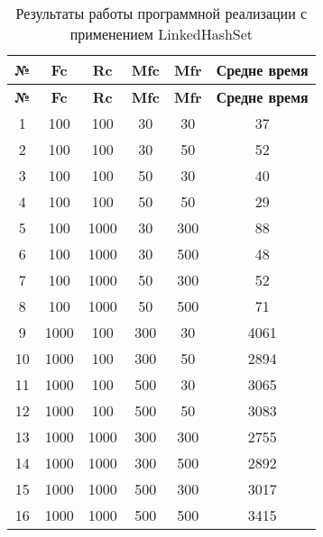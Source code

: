 \begin{longtable}{|c|c|c|c|c|c|}
    \caption{Результаты работы программной реализации с применением LinkedHashSet}
    \label{tab:linkedhashset}\\
    \hline
    \bfseries{№} & \bfseries{Fc} & \bfseries{Rc} & \bfseries{Mfc} & \bfseries{Mfr} & \bfseries{Средне время} \\
    \hline
    \endfirsthead
    \hline
    \bfseries{№} & \bfseries{Fc} & \bfseries{Rc} & \bfseries{Mfc} & \bfseries{Mfr} & \bfseries{Средне время} \\
    \hline
    \endhead
    \hline
    1 & 100 & 100 & 30 & 30 & 37 \\
    \hline
    2 & 100 & 100 & 30 & 50 & 52 \\
    \hline
    3 & 100 & 100 & 50 & 30 & 40 \\
    \hline
    4 & 100 & 100 & 50 & 50 & 29 \\
    \hline
    5 & 100 & 1000 & 30 & 300 & 88 \\
    \hline
    6 & 100 & 1000 & 30 & 500 & 48 \\
    \hline
    7 & 100 & 1000 & 50 & 300 & 52 \\
    \hline
    8 & 100 & 1000 & 50 & 500 & 71 \\
    \hline
    9 & 1000 & 100 & 300 & 30 & 4061 \\
    \hline
    10 & 1000 & 100 & 300 & 50 & 2894 \\
    \hline
    11 & 1000 & 100 & 500 & 30 & 3065 \\
    \hline
    12 & 1000 & 100 & 500 & 50 & 3083 \\
    \hline
    13 & 1000 & 1000 & 300 & 300 & 2755 \\
    \hline
    14 & 1000 & 1000 & 300 & 500 & 2892 \\
    \hline
    15 & 1000 & 1000 & 500 & 300 & 3017 \\
    \hline
    16 & 1000 & 1000 & 500 & 500 & 3415 \\
    \hline
\end{longtable}

